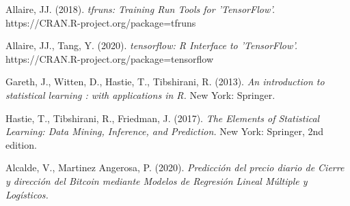 \documentclass[a4paper,12pt,twocolumn]{article}
\begin{document}
\begin{thebibliography}{99}
Allaire, JJ. (2018).
{\em tfruns: Training Run Tools for 'TensorFlow'.}
https://CRAN.R-project.org/package=tfruns

Allaire, JJ., Tang, Y. (2020).
{\em tensorflow: R Interface to 'TensorFlow'.}
https://CRAN.R-project.org/package=tensorflow

Gareth, J., Witten, D., Hastie, T., Tibshirani, R. (2013). 
{\em An introduction to statistical learning : with applications in R.}
New York: Springer.

Hastie, T., Tibshirani, R., Friedman, J. (2017). 
{\em The Elements of Statistical Learning: Data Mining, Inference, and Prediction.}
New York: Springer, 2nd edition.

Alcalde, V., Martinez Angerosa, P. (2020). 
{\em Predicción del precio diario de Cierre y dirección del Bitcoin mediante Modelos de Regresión Lineal Múltiple y Logísticos.}

\end{thebibliography}
\end{document}
